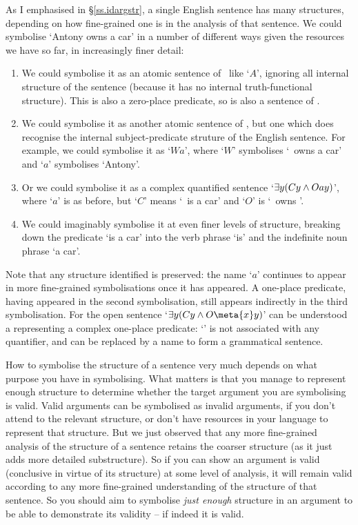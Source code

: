 As I emphasised in §\ref{ss.idargstr}, a single English sentence has many structures, depending on how fine-grained one is in the analysis of that sentence. We could symbolise `Antony owns a car' in a number of different ways given the resources we have so far, in increasingly finer detail: \begin{enumerate}
	\item We could symbolise it as an atomic sentence of \TFL\ like `$A$', ignoring all internal structure of the sentence (because it has no internal truth-functional structure). This is also a zero-place predicate, so is also a sentence of \FOL. 
	\item We could symbolise it as another atomic sentence of \FOL, but one which does recognise the internal subject-predicate struture of the English sentence. For example, we could symbolise it as `$Wa$', where `$W$' symbolises `\ owns a car' and `$a$' symbolises `Antony'.
	\item Or we could symbolise it as a complex quantified sentence `$\exists y (Cy \wedge Oay)$', where `$a$' is as before, but `$C$' means `\ is a car' and `$O$' is `\ owns '.
	\item We could imaginably symbolise it at even finer levels of structure, breaking down the predicate `is a car' into the verb phrase `is' and the indefinite noun phrase `a car'. 
\end{enumerate} Note that any structure identified is preserved: the name `$a$' continues to appear in more fine-grained symbolisations once it has appeared. A one-place predicate, having appeared in the second symbolisation, still appears indirectly in the third symbolisation. For the open sentence `$\exists y (Cy \eand O\meta{x}y)$' can be understood a representing a complex one-place predicate:  `' is not associated with any quantifier, and can be replaced by a name to form a grammatical sentence.

How to symbolise the structure of a sentence very much depends on what purpose you have in symbolising. What matters is that you manage to represent enough structure to determine whether the target argument you are symbolising is valid. Valid arguments can be symbolised as invalid arguments, if you don't attend to the relevant structure, or don't have resources in your language to represent that structure. But we just observed that any more fine-grained analysis of the structure of a sentence retains the coarser structure (as it just adds more detailed substructure). So if you can show an argument is valid (conclusive in virtue of its structure) at some level of analysis, it will remain valid according to any more fine-grained understanding of the structure of that sentence. So you should aim to symbolise \emph{just enough} structure in an argument to be able to demonstrate its validity – if indeed it is valid. 

